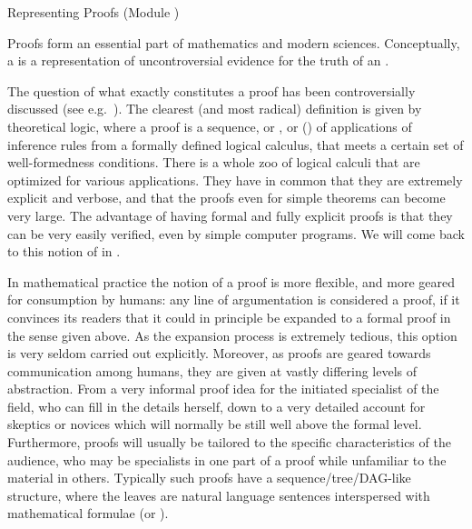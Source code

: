 
\begin{tchapter}[id=proofs,short=Representing Proofs]{Representing Proofs (Module {})}

  Proofs form an essential part of mathematics and modern sciences.  Conceptually, a
  {} is a representation of uncontroversial evidence for the truth of an
  {}.
  
  The question of what exactly constitutes a proof has been controversially discussed (see
  e.g.~\cite{BarCoh:ecm01}). The clearest (and most radical) definition is given by
  theoretical logic, where a proof is a sequence, or {}, or
  {} ({})
  of applications of inference rules from a formally defined logical calculus, that meets
  a certain set of well-formedness conditions.  There is a whole zoo of logical
  calculi that are optimized for various applications. They have
  in common that they are extremely explicit and verbose, and that the proofs even for
  simple theorems can become very large. The advantage of having formal and fully explicit
  proofs is that they can be very easily verified, even by simple computer programs.  We
  will come back to this notion of {} in {}.

  In mathematical practice the notion of a proof is more flexible, and more geared for
  consumption by humans: any line of argumentation is considered a proof, if it convinces
  its readers that it could in principle be expanded to a formal proof in the sense given
  above. As the expansion process is extremely tedious, this option is very seldom carried
  out explicitly. Moreover, as proofs are geared towards communication among humans, they
  are given at vastly differing levels of abstraction. From a very informal proof idea for
  the initiated specialist of the field, who can fill in the details herself, down to a
  very detailed account for skeptics or novices which will normally be still well above
  the formal level. Furthermore, proofs will usually be tailored to the specific
  characteristics of the audience, who may be specialists in one part of a proof while
  unfamiliar to the material in others. Typically such proofs have a
  sequence/tree/DAG-like structure, where the leaves are natural language sentences
  interspersed with mathematical formulae (or {}).


\end{tchapter}

